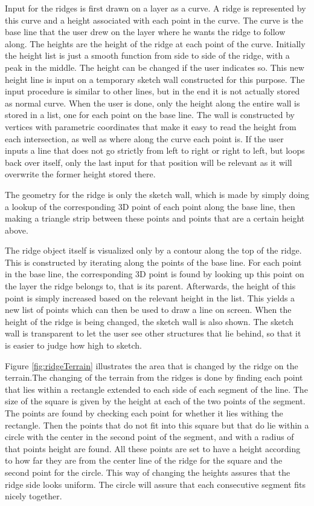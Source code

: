 \documentclass[a4paper,12pt]{report}
\begin{document}
Input for the ridges is first drawn on a layer as a curve. A ridge is represented by this curve and a height associated with each point in the curve. The curve is the base line that the user drew on the layer where he wants the ridge to follow along. The heights are the height of the ridge at each point of the curve. Initially the height list is just a smooth function from side to side of the ridge, with a peak in the middle. The height can be changed if the user indicates so. This new height line is input on a temporary sketch wall constructed for this purpose. The input procedure is similar to other lines, but in the end it is not actually stored as normal curve. When the user is done, only the height along the entire wall is stored in a list, one for each point on the base line. The wall is constructed by vertices with parametric coordinates that make it easy to read the height from each intersection, 
as 
well as where along the curve each point is. If the user inputs a line that does not go strictly from left to right or right to left, but loops back over itself, only the last input for that position will be relevant as it will overwrite the former height stored there.

The geometry for the ridge is only the sketch wall, which is made by simply doing a lookup of the corresponding 3D point of each point along the base line, then making a triangle strip between these points and points that are a certain height above.

The ridge object itself is visualized only by a contour along the top of the ridge. This is constructed by iterating along the points of the base line. For each point in the base line, the corresponding 3D point is found by looking up this point on the layer the ridge belongs to, that is its parent. Afterwards, the height of this point is simply increased based on the relevant height in the list. This yields a new list of points which can then be used to draw a line on screen. When the height of the ridge is being changed, the sketch wall is also shown. The sketch wall is transparent to let the user see other structures that lie behind, so that it is easier to judge how high to sketch.

Figure \ref{fig:ridgeTerrain} illustrates the area that is changed by the ridge on the terrain.The changing of the terrain from the ridges is done by finding each point that lies within a rectangle extended to each side of each segment of the line. The size of the square is given by the height at each of the two points of the segment. The points are found by checking each point for whether it lies withing the rectangle. Then the points that do not fit into this square but that do lie within a circle with the center in the second point of the segment, and with a radius of that points height are found. All these points are set to have a height according to how far they are from the center line of the ridge for the square and the second point for the circle. This way of changing the heights assures that the ridge side looks uniform. The circle will assure that each consecutive segment fits nicely together.
\end{document}
